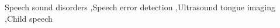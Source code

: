 \documentclass[final,5p,times,twocolumn,11pt]{elsarticle}
\begin{document}
\begin{frontmatter}
\begin{keyword}
Speech sound disorders \sep Speech error detection \sep Ultrasound tongue imaging \sep Child speech
\end{keyword}

\end{frontmatter}











\end{document}
